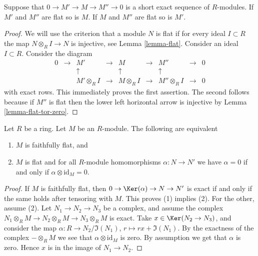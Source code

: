 \begin{lemma}
\label{lemma-flat-ses}
Suppose that $0 \to M' \to M \to M'' \to 0$ is
a short exact sequence of $R$-modules.
If $M'$ and $M''$ are flat so is $M$.
If $M$ and $M''$ are flat so is $M'$.
\end{lemma}

\begin{proof}
We will use the criterion that a module $N$ is flat if for
every ideal $I \subset R$ the map $N \otimes_R I \to N$ is injective,
see Lemma \ref{lemma-flat}.
Consider an ideal $I \subset R$.
Consider the diagram
$$
\begin{matrix}
0 & \to & M' & \to & M & \to & M'' & \to & 0 \\
& & \uparrow & & \uparrow & & \uparrow & & \\
& & M'\otimes_R I & \to & M \otimes_R I & \to & M''\otimes_R I & \to & 0
\end{matrix}
$$
with exact rows. This immediately proves the first assertion.
The second follows because if $M''$ is flat then the lower left
horizontal arrow is injective by Lemma \ref{lemma-flat-tor-zero}.
\end{proof}

\begin{lemma}
\label{lemma-easy-ff}
Let $R$ be a ring.
Let $M$ be an $R$-module.
The following are equivalent
\begin{enumerate}
\item $M$ is faithfully flat, and
\item $M$ is flat and for all $R$-module homomorphisms $\alpha : N \to N'$
we have $\alpha = 0$ if and only if $\alpha \otimes \text{id}_M = 0$.
\end{enumerate}
\end{lemma}

\begin{proof}
If $M$ is faithfully flat, then
$0 \to \Ker(\alpha) \to N \to N'$ is exact if and only if the same holds
after tensoring with $M$. This proves (1) implies (2).
For the other, assume (2). Let $N_1 \to N_2 \to N_3$
be a complex, and assume the complex
$N_1 \otimes_R M \to N_2 \otimes_R M \to N_3\otimes_R M$
is exact. Take $x \in \Ker(N_2 \to N_3)$,
and consider the map $\alpha : R \to N_2/\Im(N_1)$,
$r \mapsto rx + \Im(N_1)$. By the exactness
of the complex $-\otimes_R M$ we see that $\alpha \otimes
\text{id}_M$ is zero. By assumption we get that $\alpha$ is
zero. Hence $x $ is in the image of $N_1 \to N_2$.
\end{proof}

